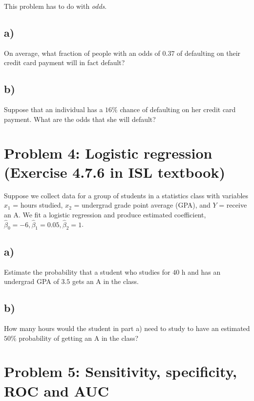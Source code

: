 \documentclass[
]{article}
\begin{document}
This problem has to do with \emph{odds}.

\hypertarget{a-2}{%
\subsection{a)}\label{a-2}}

On average, what fraction of people with an odds of \(0.37\) of
defaulting on their credit card payment will in fact default?

\hypertarget{b-2}{%
\subsection{b)}\label{b-2}}

Suppose that an individual has a \(16\%\) chance of defaulting on her
credit card payment. What are the odds that she will default?

\hypertarget{problem-4-logistic-regression-exercise-4.7.6-in-isl-textbook}{%
\section{Problem 4: Logistic regression (Exercise 4.7.6 in ISL
textbook)}\label{problem-4-logistic-regression-exercise-4.7.6-in-isl-textbook}}

Suppose we collect data for a group of students in a statistics class
with variables \(x_1\) = hours studied, \(x_2\) = undergrad grade point
average (GPA), and \(Y\) = receive an A. We fit a logistic regression
and produce estimated coefficient,
\(\hat{\beta}_0 = -6, \hat{\beta}_1 = 0.05, \hat{\beta}_2 = 1\).

\hypertarget{a-3}{%
\subsection{a)}\label{a-3}}

Estimate the probability that a student who studies for \(40\) h and has
an undergrad GPA of \(3.5\) gets an A in the class.

\hypertarget{b-3}{%
\subsection{b)}\label{b-3}}

How many hours would the student in part a) need to study to have an
estimated \(50\%\) probability of getting an A in the class?

\hypertarget{problem-5-sensitivity-specificity-roc-and-auc}{%
\section{Problem 5: Sensitivity, specificity, ROC and
AUC}\label{problem-5-sensitivity-specificity-roc-and-auc}}
\end{document}
